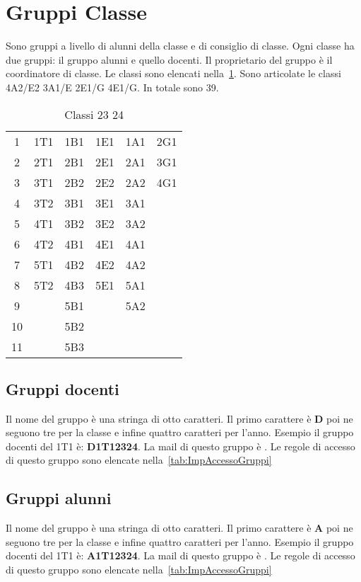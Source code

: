\section{Gruppi Classe}
Sono gruppi a livello di alunni della classe e di consiglio di classe. Ogni classe ha due gruppi: il gruppo alunni e quello docenti. Il proprietario del gruppo è il coordinatore di classe. Le classi sono elencati nella~\cref{tab:classi2324}. Sono articolate le classi 4A2/E2 3A1/E 2E1/G 4E1/G. In totale sono 39.
\begin{table}
	\centering
	\begin{tabular}{cccccc}
\toprule
1&1T1	& 1B1 & 1E1 & 1A1 &2G1  \\
2&2T1	& 2B1 & 2E1 & 2A1 & 3G1 \\
3&3T1	&  2B2& 2E2 & 2A2 & 4G1 \\
4&3T2	&  3B1& 3E1 & 3A1 &  \\
5&4T1	&  3B2&  3E2& 3A2 &  \\
6&4T2	& 4B1 & 4E1 & 4A1 &  \\
7&5T1	& 4B2 & 4E2 & 4A2 &  \\
8&5T2	& 4B3 & 5E1 & 5A1 &  \\
9&	&  5B1&   & 5A2 & \\
10&	&  5B2&    &  \\
11&	&  5B3&         &  \\
\bottomrule
\end{tabular}
	\caption{Classi 23 24}
	\label{tab:classi2324}
\end{table}
\subsection{Gruppi docenti}
Il nome del gruppo è una stringa di otto caratteri. Il primo  carattere è \textbf{D} poi ne seguono tre  per la classe e infine quattro caratteri per l'anno.
Esempio il gruppo docenti del 1T1 è: \textbf{D1T12324}. La mail di questo gruppo è . Le  regole di accesso di questo gruppo sono elencate nella~\cref{tab:ImpAccessoGruppi}
\subsection{Gruppi alunni}
Il nome del gruppo è una stringa di otto caratteri. Il primo  carattere è \textbf{A} poi ne seguono tre  per la classe e infine quattro caratteri per l'anno.
Esempio il gruppo docenti del 1T1 è: \textbf{A1T12324}. La mail di questo gruppo è . Le  regole di accesso di questo gruppo sono elencate nella~\cref{tab:ImpAccessoGruppi}
